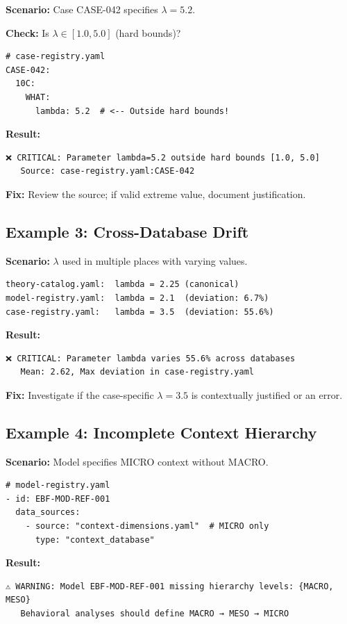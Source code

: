 \textbf{Scenario:} Case CASE-042 specifies $\lambda = 5.2$.

\textbf{Check:} Is $\lambda \in [1.0, 5.0]$ (hard bounds)?

\begin{verbatim}
# case-registry.yaml
CASE-042:
  10C:
    WHAT:
      lambda: 5.2  # <-- Outside hard bounds!
\end{verbatim}

\textbf{Result:}
\begin{verbatim}
❌ CRITICAL: Parameter lambda=5.2 outside hard bounds [1.0, 5.0]
   Source: case-registry.yaml:CASE-042
\end{verbatim}

\textbf{Fix:} Review the source; if valid extreme value, document justification.

\subsection{Example 3: Cross-Database Drift}

\textbf{Scenario:} $\lambda$ used in multiple places with varying values.

\begin{verbatim}
theory-catalog.yaml:  lambda = 2.25 (canonical)
model-registry.yaml:  lambda = 2.1  (deviation: 6.7%)
case-registry.yaml:   lambda = 3.5  (deviation: 55.6%)
\end{verbatim}

\textbf{Result:}
\begin{verbatim}
❌ CRITICAL: Parameter lambda varies 55.6% across databases
   Mean: 2.62, Max deviation in case-registry.yaml
\end{verbatim}

\textbf{Fix:} Investigate if the case-specific $\lambda = 3.5$ is contextually justified or an error.

\subsection{Example 4: Incomplete Context Hierarchy}

\textbf{Scenario:} Model specifies MICRO context without MACRO.

\begin{verbatim}
# model-registry.yaml
- id: EBF-MOD-REF-001
  data_sources:
    - source: "context-dimensions.yaml"  # MICRO only
      type: "context_database"
\end{verbatim}

\textbf{Result:}
\begin{verbatim}
⚠️ WARNING: Model EBF-MOD-REF-001 missing hierarchy levels: {MACRO, MESO}
   Behavioral analyses should define MACRO → MESO → MICRO
\end{verbatim}

